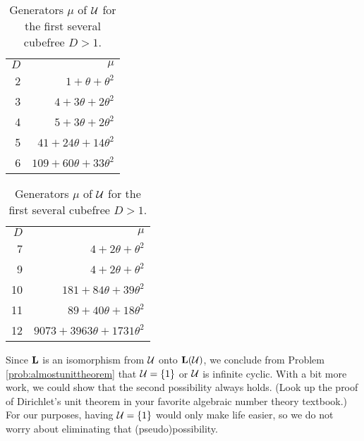 \setlength{\tabcolsep}{12pt}
\begin{table}[b]
    \begin{minipage}{.5\linewidth}
      \centering
        \begin{tabular}{rr}\toprule
        \multicolumn{1}{r}{$D$} & \multicolumn{1}{r}{$\mu$}\\ \cmidrule(lr){1-1}\cmidrule(lr){2-2} %
            2 & $1+\theta+\theta^2$ \\
            3 & $4+3\theta+2\theta^2$ \\
            4 & $5 + 3\theta + 2\theta^2$ \\
            5 & $41 + 24\theta + 14\theta^2$ \\
            6 & $109 + 60\theta + 33 \theta^2$ \\\bottomrule
        \end{tabular}
    \end{minipage}%
    \begin{minipage}{.5\linewidth}
      \centering
        \begin{tabular}{rr}\toprule
            \multicolumn{1}{r}{$D$} & \multicolumn{1}{r}{$\mu$}\\ \cmidrule(lr){1-1}\cmidrule(lr){2-2} %
            7 & $4 + 2\theta + \theta^2$ \\
            9 & $4 + 2 \theta + \theta^2$ \\
            10 & $181 + 84 \theta + 39\theta^2$\\
            11 & $89 + 40 \theta + 18\theta^2$ \\
            12 & $9073 + 3963\theta + 1731\theta^2$\\\bottomrule       \end{tabular}
    \end{minipage} 
        \caption*{Generators $\mu$ of $\mathcal{U}$ for the first several cubefree $D>1$.}
\end{table}

Since $\mathbf{L}$ is an isomorphism from $\mathcal{U}$ onto $\mathbf{L}(\mathcal{U})$, we conclude from Problem \ref{prob:almostunittheorem} that  $\mathcal{U}=\{1\}$ or $\mathcal{U}$ is infinite cyclic. With a bit more work, we could show that the second possibility always holds. (Look up the proof of \textsf{Dirichlet's unit theorem} in your favorite algebraic number theory textbook.) For our purposes, having $\mathcal{U} =\{1\}$ would only make life easier, so we do not worry about eliminating that (pseudo)possibility.

